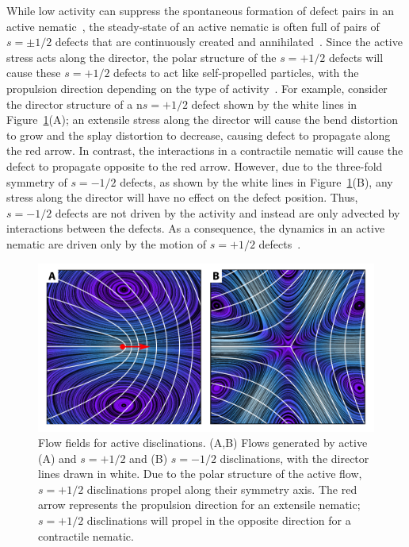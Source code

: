 While low activity can suppress the spontaneous formation of defect pairs in an active nematic~\cite{RN247,RN7}, the steady-state of an active nematic is often full of pairs of $s = \pm 1/2$ defects that are continuously created and annihilated~\cite{RN11,RN8,RN3,RN27,RN135,RN86}.
Since the active stress acts along the director, the polar structure of the $s = +1/2$ defects will cause these $s = +1/2$ defects to act like self-propelled particles, with the propulsion direction depending on the type of activity~\cite{RN11,RN8}.
For example, consider the director structure of a n$s = +1/2$ defect shown by the white lines in Figure~\ref{f:3-DefectFlow}(A); an extensile stress along the director will cause the bend distortion to grow and the splay distortion to decrease, causing defect to propagate along the red arrow.
In contrast, the interactions in a contractile nematic will cause the defect to propagate opposite to the red arrow.
However, due to the three-fold symmetry of $s = -1/2$ defects, as shown by the white lines in Figure~\ref{f:3-DefectFlow}(B), any stress along the director will have no effect on the defect position.
Thus, $s = -1/2$ defects are not driven by the activity and instead are only advected by interactions between the defects.
As a consequence, the dynamics in an active nematic are driven only by the motion of $s = +1/2$ defects~\cite{RN7}.
\begin{figure}
  \centering
  \includegraphics{figures/C3/Ch3-Figs_DefectFlow.png}
  \caption{Flow fields for active disclinations.
  (A,B) Flows generated by active (A) and $s=+1/2$ and (B) $s=-1/2$ disclinations, with the director lines drawn in white.
  Due to the polar structure of the active flow, $s = +1/2$ disclinations propel along their symmetry axis.
  The red arrow represents the propulsion direction for an extensile nematic; $s = +1/2$ disclinations will propel in the opposite direction for a contractile nematic.}\label{f:3-DefectFlow}
\end{figure}

